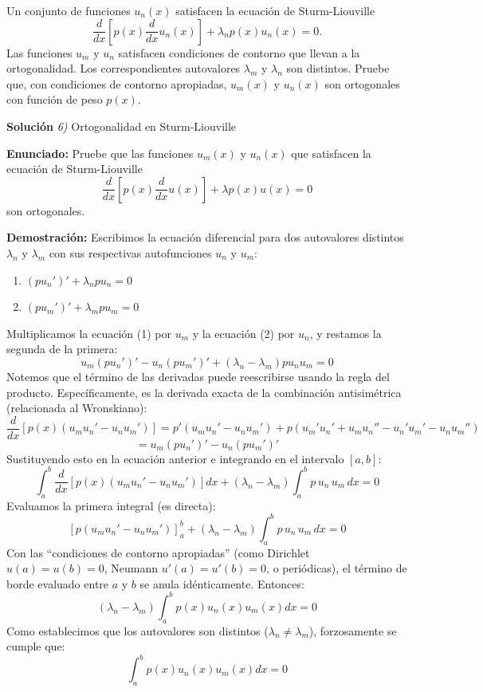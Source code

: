 \documentclass[11pt,spanish]{article}
\newcounter{problema}
\newcommand{\prob}{\stepcounter{problema} \vspace{.5cm} \noindent{\bf Problema \arabic{problema}: }}
\begin{document}
\prob Un conjunto de funciones $u_n(x)$ satisfacen la ecuación de Sturm-Liouville
$$
\frac{d}{dx}\left[p(x)\frac{d}{dx}u_n(x)\right] + \lambda_n p(x)u_n(x) = 0.
$$
Las funciones $u_m$ y $u_n$ satisfacen condiciones de contorno que llevan a la ortogonalidad. Los correspondientes autovalores $\lambda_m$ y $\lambda_n$ son distintos. Pruebe que, con condiciones de contorno apropiadas, $u_m(x)$ y $u_n(x)$ son ortogonales con función de peso $p(x)$.



\vspace{0.5cm}
{\bf Soluci\'on }{\em 6)}
Ortogonalidad en Sturm-Liouville
\vspace{0.5cm}

{\bf Enunciado:}
Pruebe que las funciones $u_m(x)$ y $u_n(x)$ que satisfacen la ecuación de Sturm-Liouville 
$$\frac{d}{dx}\left[p(x)\frac{d}{dx}u(x)\right] + \lambda p(x)u(x) = 0$$ 
son ortogonales.

{\bf Demostración:}
Escribimos la ecuación diferencial para dos autovalores distintos $\lambda_n$ y $\lambda_m$ con sus respectivas autofunciones $u_n$ y $u_m$:
\begin{enumerate}
\item $(p u_n')' + \lambda_n p u_n = 0$
\item $(p u_m')' + \lambda_m p u_m = 0$
\end{enumerate}
Multiplicamos la ecuación (1) por $u_m$ y la ecuación (2) por $u_n$, y restamos la segunda de la primera:
$$u_m(p u_n')' - u_n(p u_m')' + (\lambda_n - \lambda_m) pu_n u_m = 0$$
Notemos que el término de las derivadas puede reescribirse usando la regla del producto. Específicamente, es la derivada exacta de la combinación antisimétrica (relacionada al Wronskiano):
$$\frac{d}{dx} \left[ p(x) (u_m u_n' - u_n u_m') \right] = p'(u_m u_n' - u_n u_m') + p(u_m' u_n' + u_m u_n'' - u_n' u_m' - u_n u_m'')$$
$$= u_m(p u_n')' - u_n(p u_m')'$$
Sustituyendo esto en la ecuación anterior e integrando en el intervalo $[a, b]$:
$$
\int_a^b \frac{d}{dx} \left[ p(x) (u_m u_n' - u_n u_m') \right] dx + (\lambda_n - \lambda_m) \int_a^b p\, u_n\, u_m\, dx = 0
$$
Evaluamos la primera integral (es directa):
$$[ p (u_m u_n' - u_n u_m') ]_a^b + (\lambda_n - \lambda_m) \int_a^b p\, u_n\, u_m\, dx = 0$$
Con las ``condiciones de contorno apropiadas'' (como Dirichlet $u(a)=u(b)=0$, Neumann $u'(a)=u'(b)=0$, o periódicas), el término de borde evaluado entre $a$ y $b$ se anula idénticamente. Entonces:
$$
(\lambda_n - \lambda_m) \int_a^b p(x) u_n(x) u_m(x) dx = 0
$$
Como establecimos que los autovalores son distintos ($\lambda_n \neq \lambda_m$), forzosamente se cumple que:
$$\int_a^b p(x) u_n(x) u_m(x) dx = 0$$
\end{document}
